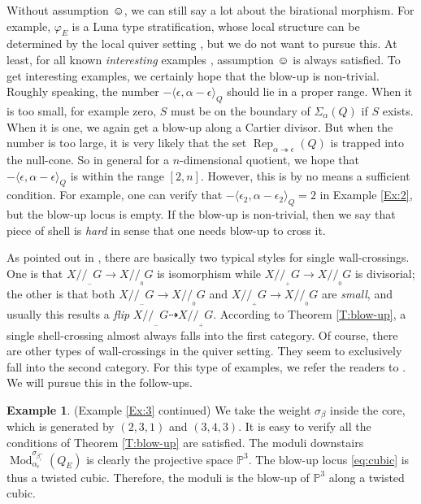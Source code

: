 \documentclass{amsart}
\theoremstyle{definition}
\newtheorem{example}[theorem]{Example}
\theoremstyle{remark}
\numberwithin{equation}{section}
\begin{document}
Without assumption $\smiley$, we can still say a lot about the birational morphism. For example, $\varphi_E$ is a Luna type stratification, whose local structure can be determined by the local quiver setting \cite{AL}, but we do not want to pursue this. At least, for all known {\em interesting} examples \cite{F2}, assumption $\smiley$ is always satisfied. To get interesting examples, we certainly hope that the blow-up is non-trivial. Roughly speaking, the number $-{\langle{\epsilon,\alpha-\epsilon}\rangle}_Q$ should lie in a proper range. When it is too small, for example zero, $S$ must be on the boundary of $\Sigma_\alpha(Q)$ if $S$ exists. When it is one, we again get a blow-up along a Cartier divisor. But when the number is too large, it is very likely that the set ${\operatorname{Rep}}_{\alpha\twoheadrightarrow\epsilon}(Q)$ is trapped into the null-cone. So in general for a $n$-dimensional quotient, we hope that $-{\langle{\epsilon,\alpha-\epsilon}\rangle}_Q$ is within the range $[2,n]$. However, this is by no means a sufficient condition. For example, one can verify that $-{\langle{\epsilon_2,\alpha-\epsilon_2}\rangle}_Q=2$ in Example \ref{Ex:2}, but the blow-up locus is empty. If the blow-up is non-trivial, then we say that piece of shell is {\em hard} in sense that one needs blow-up to cross it.

As pointed out in \cite{T}, there are basically two typical styles for single wall-crossings. One is that $X{/\!\!/_{\!\!_{-}}}G\to X{/\!\!/_{\!\!_{0}}}G$ is isomorphism while $X{/\!\!/_{\!\!_{+}}}G\to X{/\!\!/_{\!\!_{0}}}G$ is divisorial; the other is that both $X{/\!\!/_{\!\!_{-}}}G\to X{/\!\!/_{\!\!_{0}}}G$ and $X{/\!\!/_{\!\!_{+}}}G\to X{/\!\!/_{\!\!_{0}}}G$ are {\em small}, and usually this results a {\em flip} $X{/\!\!/_{\!\!_{-}}}G\dashrightarrow X{/\!\!/_{\!\!_{+}}}G$. According to Theorem \ref{T:blow-up}, a single shell-crossing almost always falls into the first category. Of course, there are other types of wall-crossings in the quiver setting. They seem to exclusively fall into the second category. For this type of examples, we refer the readers to \cite{F2}. We will pursue this in the follow-ups.

\begin{example} \label{Ex:3c} (Example \ref{Ex:3} continued) We take the weight $\sigma_\beta$ inside the core, which is generated by $(2,3,1)$ and $(3,4,3)$. It is easy to verify all the conditions of Theorem \ref{T:blow-up} are satisfied. The moduli downstairs ${\operatorname{Mod}}_{\alpha_\epsilon}^{\sigma_{\beta_\epsilon^\vee}}(Q_E)$ is clearly the projective space ${\mathbb{{P}}}^3$. The blow-up locus \eqref{eq:cubic} is thus a twisted cubic. Therefore, the moduli is the blow-up of ${\mathbb{{P}}}^3$ along a twisted cubic.
\end{example}
\end{document}
